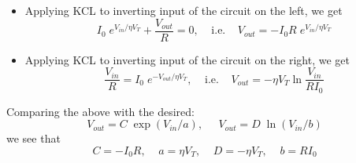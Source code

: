 \documentclass{article}
\begin{document}
  \begin{itemize}  
  \item Applying KCL to inverting input of the circuit on the left, 
  we get
  \begin{equation}
  I_0\;e^{V_{in}/\eta V_T}+\frac{V_{out}}{R}=0,\;\;\;\;\mbox{i.e.}\;\;\;\;
  V_{out}=-I_0R\;e^{V_{in}/\eta V_T}
  \end{equation}      
  \item Applying KCL to inverting input of the circuit on the right, 
  we get
  \begin{equation}
  \frac{V_{in}}{R}=I_0\;e^{-V_{out}/\eta V_T},\;\;\;\;\mbox{i.e.}\;\;\;\;
  V_{out}=-\eta V_T \ln\frac{V_{in}}{RI_0}
  \end{equation}      
  \end{itemize}
  Comparing the above with the desired:
  \begin{equation}
  V_{out}=C \;\exp(V_{in}/a),\;\;\;\;\;V_{out}=D\;\ln(V_{in}/b)
  \end{equation}
  we see that
  \begin{equation}
  C=-I_0R,\;\;\;\;a=\eta V_T,\;\;\;\;D=-\eta V_T,\;\;\;\;b=RI_0
  \end{equation}  
\end{document}
